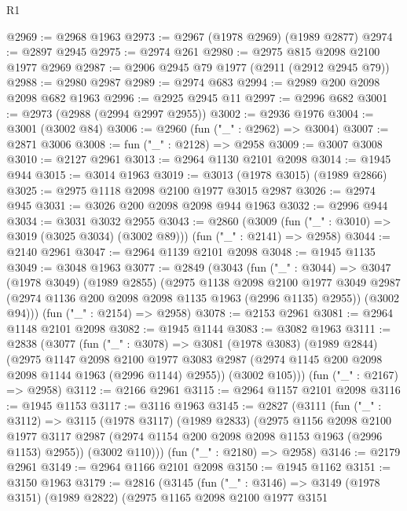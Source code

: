 \begin{lexlean}{R1}
\begin{coremodule}
@2969 := @2968 @1963
@2973 := @2967 (@1978 @2969) (@1989 @2877)
@2974 := @2897 @2945
@2975 := @2974 @261
@2980 := @2975 @815 @2098 @2100 @1977 @2969
@2987 := @2906 @2945 @79 @1977 (@2911 (@2912 @2945 @79))
@2988 := @2980 @2987
@2989 := @2974 @683
@2994 := @2989 @200 @2098 @2098 @682 @1963
@2996 := @2925 @2945 @11
@2997 := @2996 @682
@3001 := @2973 (@2988 (@2994 @2997 @2955))
@3002 := @2936 @1976
@3004 := @3001 (@3002 @84)
@3006 := @2960 (fun ("_" : @2962) => @3004)
@3007 := @2871 @3006
@3008 := fun ("_" : @2128) => @2958
@3009 := @3007 @3008
@3010 := @2127 @2961
@3013 := @2964 @1130 @2101 @2098
@3014 := @1945 @944
@3015 := @3014 @1963
@3019 := @3013 (@1978 @3015) (@1989 @2866)
@3025 := @2975 @1118 @2098 @2100 @1977 @3015 @2987
@3026 := @2974 @945
@3031 := @3026 @200 @2098 @2098 @944 @1963
@3032 := @2996 @944
@3034 := @3031 @3032 @2955
@3043 := @2860
    (@3009 (fun ("_" : @3010) => @3019 (@3025 @3034) (@3002 @89)))
    (fun ("_" : @2141) => @2958)
@3044 := @2140 @2961
@3047 := @2964 @1139 @2101 @2098
@3048 := @1945 @1135
@3049 := @3048 @1963
@3077 := @2849
    (@3043
      (fun ("_" : @3044) =>
      @3047
        (@1978 @3049)
        (@1989 @2855)
        (@2975
          @1138
          @2098
          @2100
          @1977
          @3049
          @2987
          (@2974 @1136 @200 @2098 @2098 @1135 @1963 (@2996 @1135) @2955))
        (@3002 @94)))
    (fun ("_" : @2154) => @2958)
@3078 := @2153 @2961
@3081 := @2964 @1148 @2101 @2098
@3082 := @1945 @1144
@3083 := @3082 @1963
@3111 := @2838
    (@3077
      (fun ("_" : @3078) =>
      @3081
        (@1978 @3083)
        (@1989 @2844)
        (@2975
          @1147
          @2098
          @2100
          @1977
          @3083
          @2987
          (@2974 @1145 @200 @2098 @2098 @1144 @1963 (@2996 @1144) @2955))
        (@3002 @105)))
    (fun ("_" : @2167) => @2958)
@3112 := @2166 @2961
@3115 := @2964 @1157 @2101 @2098
@3116 := @1945 @1153
@3117 := @3116 @1963
@3145 := @2827
    (@3111
      (fun ("_" : @3112) =>
      @3115
        (@1978 @3117)
        (@1989 @2833)
        (@2975
          @1156
          @2098
          @2100
          @1977
          @3117
          @2987
          (@2974 @1154 @200 @2098 @2098 @1153 @1963 (@2996 @1153) @2955))
        (@3002 @110)))
    (fun ("_" : @2180) => @2958)
@3146 := @2179 @2961
@3149 := @2964 @1166 @2101 @2098
@3150 := @1945 @1162
@3151 := @3150 @1963
@3179 := @2816
    (@3145
      (fun ("_" : @3146) =>
      @3149
        (@1978 @3151)
        (@1989 @2822)
        (@2975
          @1165
          @2098
          @2100
          @1977
          @3151

\end{coremodule}
\end{lexlean}
